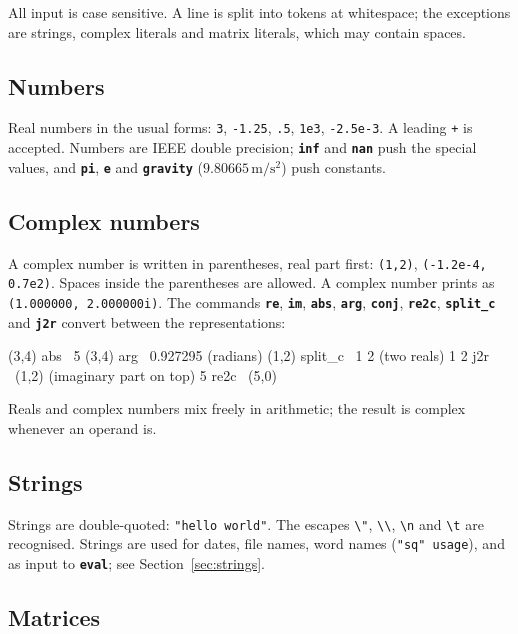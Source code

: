 \documentclass[11pt,letterpaper]{article}
\newcommand{\code}[1]{\texttt{#1}}
\newcommand{\cmd}[1]{\texttt{\textbf{#1}}}
\begin{document}
All input is case sensitive. A line is split into tokens at whitespace; the exceptions are strings, complex literals and matrix literals, which may contain spaces.

\subsection{Numbers}

Real numbers in the usual forms: \code{3}, \code{-1.25}, \code{.5}, \code{1e3}, \code{-2.5e-3}. A leading \code{+} is accepted. Numbers are IEEE double precision; \cmd{inf} and \cmd{nan} push the special values, and \cmd{pi}, \cmd{e} and \cmd{gravity} ($9.80665\,\mathrm{m/s^2}$) push constants.

\subsection{Complex numbers}

A complex number is written in parentheses, real part first: \code{(1,2)}, \code{(-1.2e-4, 0.7e2)}. Spaces inside the parentheses are allowed. A complex number prints as \code{(1.000000, 2.000000i)}. The commands \cmd{re}, \cmd{im}, \cmd{abs}, \cmd{arg}, \cmd{conj}, \cmd{re2c}, \cmd{split\_c} and \cmd{j2r} convert between the representations:
\begin{rpn}
(3,4) abs        \ 5
(3,4) arg        \ 0.927295  (radians)
(1,2) split_c    \ 1 2       (two reals)
1 2 j2r          \ (1,2)     (imaginary part on top)
5 re2c           \ (5,0)
\end{rpn}
Reals and complex numbers mix freely in arithmetic; the result is complex whenever an operand is.

\subsection{Strings}

Strings are double-quoted: \code{"hello world"}. The escapes \code{\textbackslash"}, \code{\textbackslash\textbackslash}, \code{\textbackslash n} and \code{\textbackslash t} are recognised. Strings are used for dates, file names, word names (\code{"sq" usage}), and as input to \cmd{eval}; see Section~\ref{sec:strings}.

\subsection{Matrices}
\end{document}
